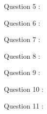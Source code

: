 \documentclass[a4paper,12pt]{article}
\begin{document}
Question 5 : %

Question 6 :%

Question 7 :%

Question 8 :%

Question 9 :%

Question 10 :%

Question 11 :
\end{document}
